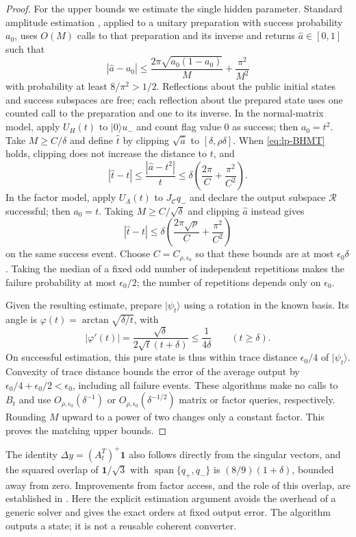 \begin{proof}
For the upper bounds we estimate the single hidden parameter. Standard amplitude estimation \cite[Theorem 12]{brassard2002}, applied to a unitary preparation with success probability $a_0$, uses $O(M)$ calls to that preparation and its inverse and returns $\widehat a\in[0,1]$ such that
\begin{equation}\label{eq:lp-BHMT}
 |\widehat a-a_0|\leq
 \frac{2\pi\sqrt{a_0(1-a_0)}}{M}+\frac{\pi^2}{M^2}
\end{equation}
with probability at least $8/\pi^2>1/2$. Reflections about the public initial states and success subspaces are free; each reflection about the prepared state uses one counted call to the preparation and one to its inverse.
In the normal-matrix model, apply $U_H(t)$ to $|0\rangle u_-$ and count flag value $0$ as success; then $a_0=t^2$. Take $M\geq C/\delta$ and define $\widehat t$ by clipping $\sqrt{\widehat a}$ to $[\delta,\rho\delta]$. When \eqref{eq:lp-BHMT} holds, clipping does not increase the distance to $t$, and
\[
 |\widehat t-t|\leq
 \frac{|\widehat a-t^2|}{t}
 \leq\delta\left(\frac{2\pi}{C}+\frac{\pi^2}{C^2}\right).
\]
In the factor model, apply $U_A(t)$ to $J_{\mathcal C}q_-$ and declare the output subspace $\mathcal R$ successful; then $a_0=t$. Taking $M\geq C/\sqrt\delta$ and clipping $\widehat a$ instead gives
\[
 |\widehat t-t|\leq
 \delta\left(\frac{2\pi\sqrt\rho}{C}+\frac{\pi^2}{C^2}\right)
\]
on the same success event. Choose $C=C_{\rho,\epsilon_0}$ so that these bounds are at most $\epsilon_0\delta$. Taking the median of a fixed odd number of independent repetitions makes the failure probability at most $\epsilon_0/2$; the number of repetitions depends only on $\epsilon_0$.

Given the resulting estimate, prepare $|\psi_{\widehat t}\rangle$ using a rotation in the known basis. Its angle is $\varphi(t)=\arctan\sqrt{\delta/t}$, with
\[
 |\varphi'(t)|=\frac{\sqrt\delta}{2\sqrt t(t+\delta)}
 \leq\frac1{4\delta}\qquad(t\geq\delta).
\]
On successful estimation, this pure state is thus within trace distance $\epsilon_0/4$ of $|\psi_t\rangle$. Convexity of trace distance bounds the error of the average output by $\epsilon_0/4+\epsilon_0/2<\epsilon_0$, including all failure events. These algorithms make no calls to $B_t$ and use $O_{\rho,\epsilon_0}(\delta^{-1})$ or $O_{\rho,\epsilon_0}(\delta^{-1/2})$ matrix or factor queries, respectively. Rounding $M$ upward to a power of two changes only a constant factor. This proves the matching upper bounds.
\end{proof}
The identity $\Delta y=(A_t^T)^+\mathbf1$ also follows directly from the singular vectors, and the squared overlap of $\mathbf1/\sqrt3$ with $\operatorname{span}\{q_+,q_-\}$ is $(8/9)(1+\delta)$, bounded away from zero. Improvements from factor access, and the role of this overlap, are established in \citet[Sections 1.4 and 5.4--5.5]{orsucci2021}. Here the explicit estimation argument avoids the overhead of a generic solver and gives the exact orders at fixed output error. The algorithm outputs a state; it is not a reusable coherent converter.

